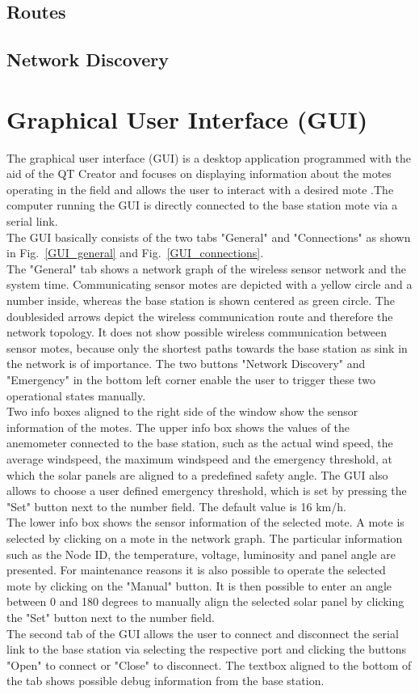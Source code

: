 \documentclass[conference]{IEEEtran}
\begin{document}
\subsection{Routes}

\subsection{Network Discovery} \label{NetDisc}

\section{Graphical User Interface (GUI)}
The graphical user interface (GUI) is a desktop application programmed with the aid of the QT Creator and focuses on displaying information about the motes operating in the field and allows the user to interact with a desired mote .The computer running the GUI is directly connected to the base station mote via a serial link.\\
The GUI basically consists of the two tabs "General" and "Connections" as shown in Fig.~\ref{GUI_general} and Fig.~\ref{GUI_connections}.\\
The "General" tab shows a network graph of the wireless sensor network and the system time. Communicating sensor motes are depicted with a yellow circle and a number inside, whereas the base station is shown centered as green circle. The doublesided arrows depict the wireless communication route and therefore the network topology. It does not show possible wireless communication between sensor motes, because only the shortest paths towards the base station as sink in the network is of importance.
The two buttons "Network Discovery" and "Emergency" in the bottom left corner enable the user to trigger these two operational states manually.\\
Two info boxes aligned to the right side of the window show the sensor information of the motes. The upper info box shows the values of the anemometer connected to the base station, such as the actual wind speed, the average windspeed, the maximum windspeed and the emergency threshold, at which the solar panels are aligned to a predefined safety angle. The GUI also allows to choose a user defined emergency threshold, which is set by pressing the "Set" button next to the number field. The default value is 16 km/h.\\
The lower info box shows the sensor information of the selected mote. A mote is selected by clicking on a mote in the network graph. The particular information such as the Node ID, the temperature, voltage, luminosity and panel angle are presented. For maintenance reasons it is also possible to operate the selected mote by clicking on the "Manual" button. It is then possible to enter an angle between 0 and 180 degrees to manually align the selected solar panel by clicking the "Set" button next to the number field.\\
The second tab of the GUI allows the user to connect and disconnect the serial link to the base station via selecting the respective port and clicking the buttons "Open" to connect or "Close" to disconnect. The textbox aligned to the bottom of the tab shows possible debug information from the base station.
\end{document}
